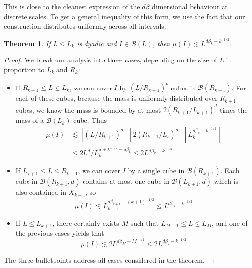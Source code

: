 \documentclass{article}
\theoremstyle{plain}
\newtheorem{corollary}{Corollary}
\theoremstyle{plain}
\newtheorem{theorem}{Theorem}
\begin{document}

This is close to the cleanest expression of the $d \beta$ dimensional behaviour at discrete scales. To get a general inequality of this form, we use the fact that our construction distributes uniformly across all intervals.

\begin{theorem}
	If $L \leq L_k$ is dyadic and $I \in \mathcal{B}(L)$, then $\mu(I) \lesssim L^{d\beta_k - k^{-1/2}}$.
\end{theorem}
\begin{proof}
	We break our analysis into three cases, depending on the size of $L$ in proportion to $L_k$ and $R_k$:
	\begin{itemize}
		\item If $R_{k+1} \leq L \leq L_k$, we can cover $I$ by $(L/R_{k+1})^d$ cubes in $\mathcal{B}(R_{k+1})$. For each of these cubes, because the mass is uniformly distributed over $R_{k+1}$ cubes, we know the mass is bounded by at most $2(R_{k+1}/L_{k+1})^d$ times the mass of a $\mathcal{B}(L_k)$ cube. Thus
		\begin{align*}
			\mu(I) &\lesssim [(L/R_{k+1})^d] [2(R_{k+1}/L_k)^d] [L_k^{d \beta_k - k^{-1/2}}]\\
			&\leq 2 L^d / L_k^{d + k^{-1/2} - d \beta_k} \leq 2 L^{d \beta_k - k^{-1/2}}
		\end{align*}

		\item If $L_{k+1} \leq L \leq R_{k+1}$, we can cover $I$ by a single cube in $\mathcal{B}(R_{k+1})$. Each cube in $\mathcal{B}(R_{k+1},d)$ contains at most one cube in $\mathcal{B}(L_{k+1},d)$ which is also contained in $X_{k+1}$, so
		\[ \mu(I) \lesssim L_{k+1}^{d\beta_{k+1} - (k+1)^{-1/2}} \leq L^{d \beta_k - k^{-1/2}} \]

		\item If $L \leq L_{k+1}$, there certainly exists $M$ such that $L_{M+1} \leq L \leq L_M$, and one of the previous cases yields that
		\[ \mu(I) \lesssim 2 L^{d \beta_M - M^{-1/2}} \leq 2 L^{d \beta_k - k^{-1/2}} \]
	\end{itemize}
	The three bulletpoints address all cases considered in the theorem.
\end{proof}
\end{document}
